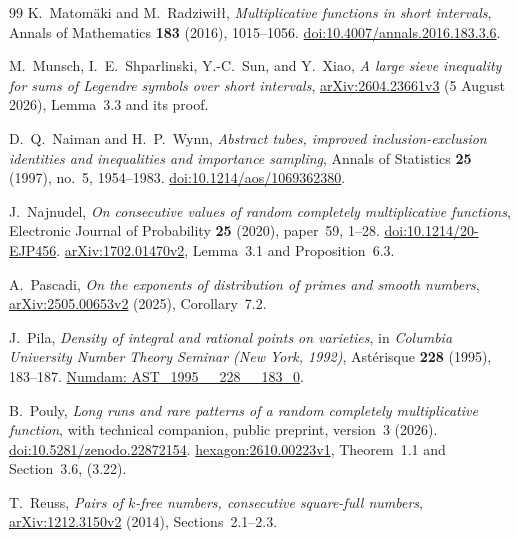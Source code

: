 \begin{thebibliography}{99}
K.~Matom\"aki and M.~Radziwi{\l}{\l},
\emph{Multiplicative functions in short intervals},
Annals of Mathematics \textbf{183} (2016), 1015--1056.
\href{https://doi.org/10.4007/annals.2016.183.3.6}
{doi:10.4007/annals.2016.183.3.6}.

M.~Munsch, I.~E.~Shparlinski, Y.-C.~Sun, and Y.~Xiao,
\emph{A large sieve inequality for sums of Legendre symbols
over short intervals},
\href{https://arxiv.org/abs/2604.23661v3}
{arXiv:2604.23661v3} (5 August 2026), Lemma~3.3 and its proof.

D.~Q.~Naiman and H.~P.~Wynn,
\emph{Abstract tubes, improved inclusion-exclusion identities
and inequalities and importance sampling},
Annals of Statistics \textbf{25} (1997), no.~5, 1954--1983.
\href{https://doi.org/10.1214/aos/1069362380}
{doi:10.1214/aos/1069362380}.

J.~Najnudel,
\emph{On consecutive values of random completely multiplicative
functions},
Electronic Journal of Probability \textbf{25} (2020), paper~59,
1--28.
\href{https://doi.org/10.1214/20-EJP456}
{doi:10.1214/20-EJP456}.
\href{https://arxiv.org/abs/1702.01470v2}
{arXiv:1702.01470v2}, Lemma~3.1 and Proposition~6.3.

\begingroup\raggedright
A.~Pascadi,
\emph{On the exponents of distribution of primes
and smooth numbers},
\href{https://arxiv.org/abs/2505.00653v2}
{arXiv:2505.00653v2} (2025), Corollary~7.2.
\par\endgroup

J.~Pila,
\emph{Density of integral and rational points on varieties},
in \emph{Columbia University Number Theory Seminar
(New York, 1992)}, Ast\'erisque \textbf{228} (1995),
183--187.
\href{https://www.numdam.org/item/AST_1995__228__183_0/}
{Numdam: AST\_1995\_\_228\_\_183\_0}.

B.~Pouly,
\emph{Long runs and rare patterns of a random completely
multiplicative function}, with technical companion,
public preprint, version~3 (2026).
\href{https://doi.org/10.5281/zenodo.22872154}
{doi:10.5281/zenodo.22872154}.
\href{https://hexagonmath.org/2610.00223v1}
{hexagon:2610.00223v1}, Theorem~1.1 and Section~3.6, (3.22).

T.~Reuss,
\emph{Pairs of \(k\)-free numbers, consecutive square-full
numbers},
\href{https://arxiv.org/abs/1212.3150v2}
{arXiv:1212.3150v2} (2014), Sections~2.1--2.3.


\end{thebibliography}
